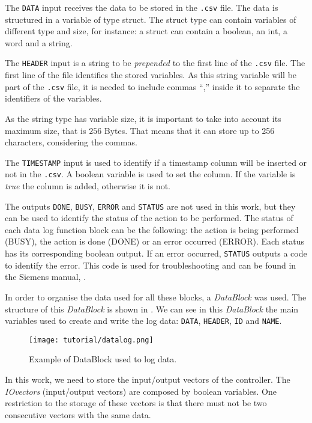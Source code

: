 The \verb|DATA| input receives the data to be stored in the \verb|.csv| file.
The data is structured in a variable of type struct. The struct type can contain variables of different type and size, for instance: a struct can contain a boolean,
an int, a word
and a string.

The \verb|HEADER| input is a string to be \emph{prepended} to the first line of
the \verb|.csv| file. The first line of the file identifies the
stored variables. As this string variable will be part of the \verb|.csv| file, it is needed to
include commas ``,'' inside it to separate the identifiers of the variables.

\begin{observation}
  \label{obs:stringSize}
 As the string type has variable size, it is important to take into account its
 maximum size, that is $256$ Bytes. That means that it can store up to 256 characters,
 considering the commas.
\end{observation}

The \verb|TIMESTAMP| input is used to identify if a timestamp column will be inserted or not in the \verb|.csv|. A boolean variable is
used to set the column. If the variable is \emph{true} the column is added, otherwise it
is not.

The outputs \verb|DONE|, \verb|BUSY|, \verb|ERROR| and \verb|STATUS| are not used
in this work, but they can be used to identify the status of the action to be
performed. The status of each data log function block can be the following: the action is being
performed (BUSY), the action is done (DONE) or an error occurred (ERROR). Each
status has its corresponding boolean output. If an error occurred, \verb|STATUS| outputs
a code to identify the error. This code is used for troubleshooting
and can be found in the Siemens manual, \cite{datalogSiemens}.

In order to organise the data used for all these blocks, a \emph{DataBlock} was
used. The structure of this \emph{DataBlock} is shown in . We can see in this \emph{DataBlock} the main variables used to create
and write the log data: \verb|DATA|, \verb|HEADER|, \verb|ID| and \verb|NAME|.


\begin{figure}[H] \centering
 \texttt{[image: tutorial/datalog.png]}
  \caption{Example of DataBlock used to log data.}
  \label{fig:exampleDataBlock}
\end{figure}


In this work, we need to store the input\slash output
vectors of the controller. The \emph{IOvectors} (input\slash output vectors) are composed by
boolean variables. One restriction to the storage of these vectors is that there
must not be two consecutive vectors with the same data.

